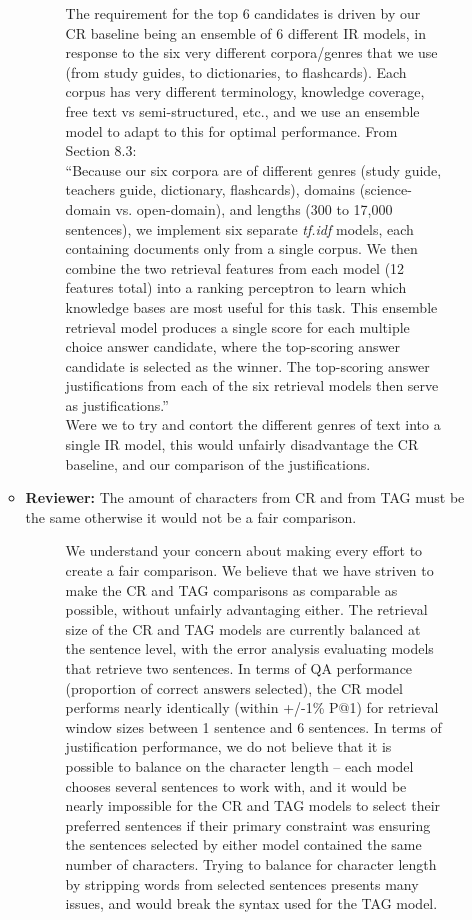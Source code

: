 \documentclass[10pt]{article}
\newcommand{\todo}[1]{\textcolor{red}{TODO: #1}}
\begin{document}
\begin{itemize}
\begin{itemize}
\begin{figure}[H]
\caption{ The requirement for the top 6 candidates is driven by our CR baseline being an ensemble of 6 different IR models, in response to the six very different corpora/genres that we use (from study guides, to dictionaries, to flashcards).  Each corpus has very different terminology, knowledge coverage, free text vs semi-structured, etc., and we use an ensemble model to adapt to this for optimal performance.  From Section 8.3: ~\\
``Because our six corpora are of different genres (study guide, teachers guide, dictionary, flashcards), domains (science-domain vs. open-domain), and lengths (300 to 17,000 sentences), we implement six separate {\em tf.idf} models, each containing documents only from a single corpus. We then combine the two retrieval features from each model (12 features total) into a ranking perceptron  to learn which knowledge bases are most useful for this task.  This ensemble retrieval model produces a single score for each multiple choice answer candidate, where the top-scoring answer candidate is selected as the winner.  The top-scoring answer justifications from each of the six retrieval models then serve as justifications.'' ~\\
Were we to try and contort the different genres of text into a single IR model, this would unfairly disadvantage the CR baseline, and our comparison of the justifications. 
\label{resp:top6}
}
\end{figure}

        \item \textbf{Reviewer:} The amount of characters from CR and from TAG must be the same otherwise
it would not be a fair comparison.

\begin{figure}[H]
\caption{ We understand your concern about making every effort to create a fair comparison.  We believe that we have striven to make the CR and TAG comparisons as comparable as possible, without unfairly advantaging either.  The retrieval size of the CR and TAG models are currently balanced at the sentence level, with the error analysis evaluating models that retrieve two sentences.  In terms of QA performance (proportion of correct answers selected), the CR model performs nearly identically (within +/-1\% P@1) for retrieval window sizes between 1 sentence and 6 sentences.  In terms of justification performance, we do not believe that it is possible to balance on the character length -- each model chooses several sentences to work with, and it would be nearly impossible for the CR and TAG models to select their preferred sentences if their primary constraint was ensuring the sentences selected by either model contained the same number of characters.  Trying to balance for character length by stripping words from selected sentences presents many issues, and would break the syntax used for the TAG model.   }
\label{resp:characters}
\end{figure}


\end{itemize}
\end{itemize}
\end{document}

